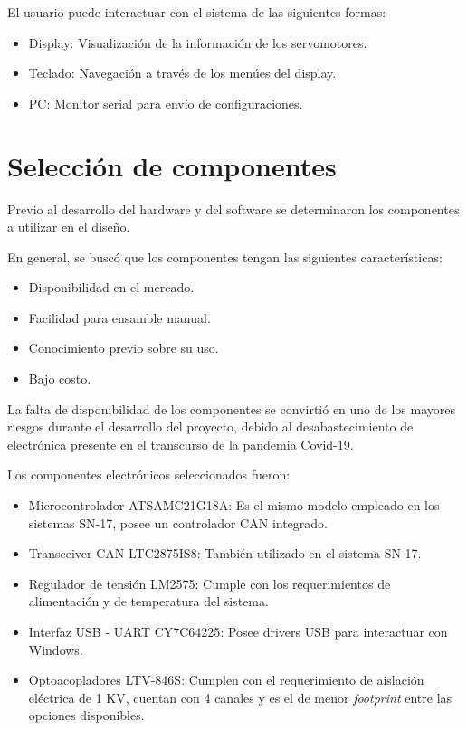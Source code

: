 El usuario puede interactuar con el sistema de las siguientes formas:
\begin{itemize}
	\item Display: Visualización de la información de los servomotores.
	\item Teclado: Navegación a través de los menúes del display.
	\item PC: Monitor serial para envío de configuraciones.
\end{itemize}

\section{Selección de componentes}
\label{seccion_seleccion_componentes}

Previo al desarrollo del hardware y del software se determinaron los componentes a utilizar en el diseño. 

En general, se buscó que los componentes tengan las siguientes características:
\begin{itemize}
	\item Disponibilidad en el mercado.
	\item Facilidad para ensamble manual.
	\item Conocimiento previo sobre su uso.
	\item Bajo costo.
\end{itemize}

La falta de disponibilidad de los componentes se convirtió en uno de los mayores riesgos durante el desarrollo del proyecto, debido al desabastecimiento de electrónica presente en el transcurso de la pandemia Covid-19.

Los componentes electrónicos seleccionados fueron:

\begin{itemize}
	\item Microcontrolador ATSAMC21G18A\citep{web_ATSAMC21G18A}: Es el mismo modelo empleado en los sistemas SN-17, posee un controlador CAN integrado.
	\item Transceiver CAN LTC2875IS8\citep{web_transciever_CAN}: También utilizado en el sistema SN-17.
	\item Regulador de tensión LM2575\citep{web_LM2575}: Cumple con los requerimientos de alimentación y de temperatura del sistema.
	\item Interfaz USB - UART CY7C64225\citep{web_interfaz_USB_UART}: Posee drivers USB para interactuar con Windows.
	\item Optoacopladores LTV-846S\citep{web_optoacopladores_LTV}: Cumplen con el requerimiento de aislación eléctrica de 1 KV, cuentan con 4 canales y es el de menor \textit{footprint} entre las opciones disponibles.
\end{itemize}

